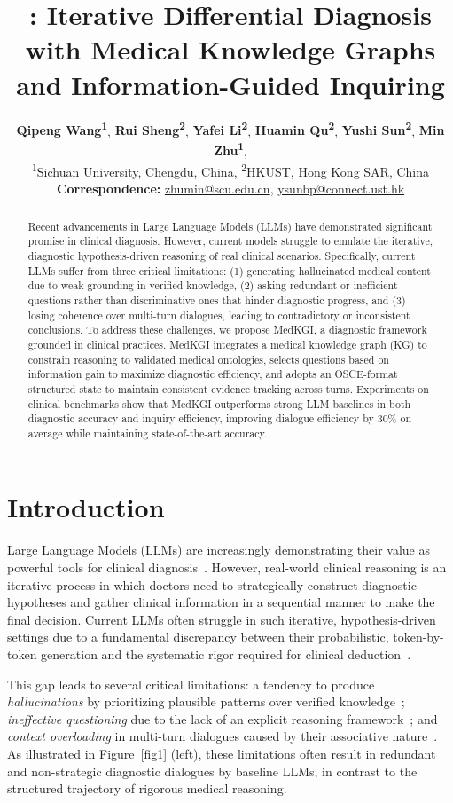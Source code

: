 \documentclass[11pt]{article}
\title{\tool{}: Iterative Differential Diagnosis with Medical Knowledge Graphs and Information-Guided Inquiring}
\author{
	\textbf{Qipeng Wang\textsuperscript{1}},
	\textbf{Rui Sheng\textsuperscript{2}},
	\textbf{Yafei Li\textsuperscript{2}},
	\textbf{Huamin Qu\textsuperscript{2}},
	\textbf{Yushi Sun\textsuperscript{2}},
	\textbf{Min Zhu\textsuperscript{1}},
	\\
	\textsuperscript{1}Sichuan University, Chengdu, China,
	\textsuperscript{2}HKUST, Hong Kong SAR, China
	\\
	\small{
		\textbf{Correspondence:} \href{mailto:email@domain}{zhumin@scu.edu.cn},
		\href{mailto:ysunbp@connect.ust.hk}{ysunbp@connect.ust.hk}
	}
}
\newcommand{\tool}{MedKGI{\xspace}}
\begin{document}
\maketitle
\begin{abstract}
Recent advancements in Large Language Models (LLMs) have demonstrated significant promise in clinical diagnosis. 
However, current models struggle to emulate the iterative, diagnostic hypothesis-driven reasoning of real clinical scenarios.
Specifically, current LLMs suffer from three critical limitations: (1) generating hallucinated medical content due to weak grounding in verified knowledge, (2) asking redundant or inefficient questions rather than discriminative ones that hinder diagnostic progress, and (3) losing coherence over multi-turn dialogues, leading to contradictory or inconsistent conclusions.
To address these challenges, we propose \tool{}, a diagnostic framework grounded in clinical practices.
\tool{} integrates a medical knowledge graph (KG) to constrain reasoning to validated medical ontologies, selects questions based on information gain to maximize diagnostic efficiency, and adopts an OSCE-format structured state to maintain consistent evidence tracking across turns.
Experiments on clinical benchmarks show that \tool{} outperforms strong LLM baselines in both diagnostic accuracy and inquiry efficiency, improving dialogue efficiency by 30\% on average while maintaining state-of-the-art accuracy.
\end{abstract}

\section{Introduction} 

Large Language Models (LLMs) are increasingly demonstrating their value as powerful tools for clinical diagnosis~\cite{huatuo2023wang, singhal2025toward, lin2025survey}. However, real-world clinical reasoning is an iterative process in which doctors need to strategically construct diagnostic hypotheses and gather clinical information in a sequential manner to make the final decision. Current LLMs often struggle in such iterative, hypothesis-driven settings due to a fundamental discrepancy between their probabilistic, token-by-token generation and the systematic rigor required for clinical deduction~\cite{eval2024hager}.

This gap leads to several critical limitations: a tendency to produce \textit{hallucinations} by prioritizing plausible patterns over verified knowledge~\cite{trust2025zhu}; \textit{ineffective questioning} due to the lack of an explicit reasoning framework~\cite{alfa2025li}; and \textit{context overloading} in multi-turn dialogues caused by their associative nature~\cite{context2024savage}. As illustrated in Figure~\ref{fig1} (left), these limitations often result in redundant and non-strategic diagnostic dialogues by baseline LLMs, in contrast to the structured trajectory of rigorous medical reasoning.
\end{document}
